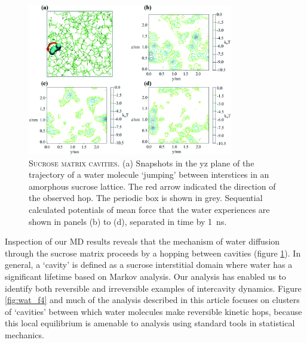 \begin{figure}
    \centering
    \includegraphics[width=0.8\textwidth]{chapters/water_hopping/figures/f3.png}
    \caption[Sucrose matrix cavities]{\textsc{Sucrose matrix cavities}. (a) Snapshots in the yz plane of the trajectory of a water molecule ‘jumping’ between interstices in an amorphous sucrose lattice. The red arrow indicated the direction of the observed hop. The periodic box is shown in grey. Sequential calculated potentials of mean force that the water experiences are shown in panels (b) to (d), separated in time by \SI{1}{\nano\second}.}
    \label{fig:wat_f3}
\end{figure}

Inspection of our MD results reveals that the mechanism of water diffusion through the sucrose matrix proceeds by a hopping between cavities (figure \ref{fig:wat_f3}). In general, a `cavity’ is defined as a sucrose interstitial domain where water has a significant lifetime based on Markov analysis. Our analysis has enabled us to identify both reversible and irreversible examples of intercavity dynamics. Figure \ref{fig:wat_f4} and much of the analysis described in this article focuses on clusters of `cavities’ between which water molecules make reversible kinetic hops, because this local equilibrium is amenable to analysis using standard tools in statistical mechanics.

